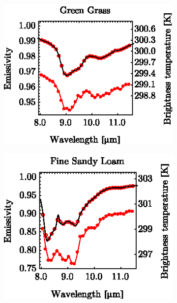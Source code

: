 \begin{figure}[thb]
	\centering
	\vspace{1em}
	\begin{subfigure}[t]{.3\linewidth}
		\centering
		\includegraphics[scale=1]{pics/Chapter_03/GreenGrass_Emiss_vs_BrightTemp.eps}
		\vspace{-0.4cm}
		\caption{}
	\end{subfigure}
	\hspace{1em}
	\begin{subfigure}[t]{.3\linewidth}
		\centering
		\includegraphics[scale=1]{pics/Chapter_03/FineSandyLoam_Emiss_vs_BrightTemp.eps}
		\vspace{-0.4cm}
		\caption{}
	\end{subfigure}
	\hspace{1em}
	\begin{subfigure}[t]{.3\linewidth}

\end{subfigure}
\end{figure}
